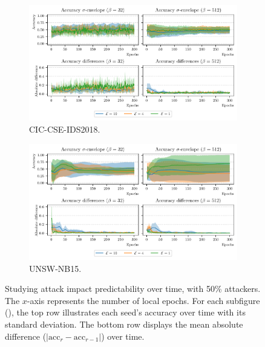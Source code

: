 \begin{figure}
  \centering
  \begin{subfigure}{\linewidth}
    \centering
    \includegraphics[width=\linewidth]{figures/cicids/predictability-all.pdf}
    \caption{
      CIC-CSE-IDS2018.
      \label{fig:predictability.cicids}
    }
  \end{subfigure}
  \begin{subfigure}{\linewidth}
    \centering
    \includegraphics[width=\linewidth]{figures/nb15/predictability-all.pdf}
    \caption{
      UNSW-NB15.
      \label{fig:predictability.nb15}
    }
  \end{subfigure}
  \caption[
    Studying attack impact predictability over time.
  ]{
    Studying attack impact predictability over time, with 50\% attackers.
    The $x$-axis represents the number of local epochs.
    For each subfigure (), the top row illustrates each seed's accuracy over time with its standard deviation.
    The bottom row displays the mean absolute difference ($|\text{acc}_r - \text{acc}_{r-1}|$) over time.
    \label{fig:assess.predictability}
  }
\end{figure}

